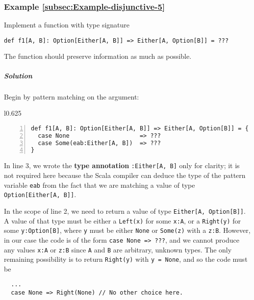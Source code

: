 \subsubsection{Example \label{subsec:Example-disjunctive-5}\ref{subsec:Example-disjunctive-5}}

Implement a function with type signature
\begin{lstlisting}
def f1[A, B]: Option[Either[A, B]] => Either[A, Option[B]] = ???
\end{lstlisting}
The function should preserve information as much as possible.

\subparagraph{Solution}

Begin by pattern matching on the argument:

\begin{wrapfigure}{l}{0.625\columnwidth}%
\vspace{-0.95\baselineskip}
\begin{lstlisting}[numbers=left,numberstyle={\small}]
def f1[A, B]: Option[Either[A, B]] => Either[A, Option[B]] = {
  case None                    => ???
  case Some(eab:Either[A, B])  => ???
}
\end{lstlisting}

\vspace{-1.15\baselineskip}
\end{wrapfigure}%

\noindent In line 3, we wrote the \textbf{type annotation}
\lstinline!:Either[A, B]! only for clarity; it is not required here
because the Scala compiler can deduce the type of the pattern variable
\lstinline!eab! from the fact that we are matching a value of type
\lstinline!Option[Either[A, B]]!.

In the scope of line 2, we need to return a value of type \lstinline!Either[A, Option[B]]!.
A value of that type must be either a \lstinline!Left(x)! for some
\lstinline!x:A!, or a \lstinline!Right(y)! for some \lstinline!y:Option[B]!,
where \lstinline!y! must be either \lstinline!None! or \lstinline!Some(z)!
with a \lstinline!z:B!. However, in our case the code is of the form
\lstinline!case None => ???!, and we cannot produce any values \lstinline!x:A!
or \lstinline!z:B! since \lstinline!A! and \lstinline!B! are arbitrary,
unknown types. The only remaining possibility is to return \lstinline!Right(y)!
with \lstinline!y = None!, and so the code must be
\begin{lstlisting}
  ...
  case None => Right(None) // No other choice here.
\end{lstlisting}

